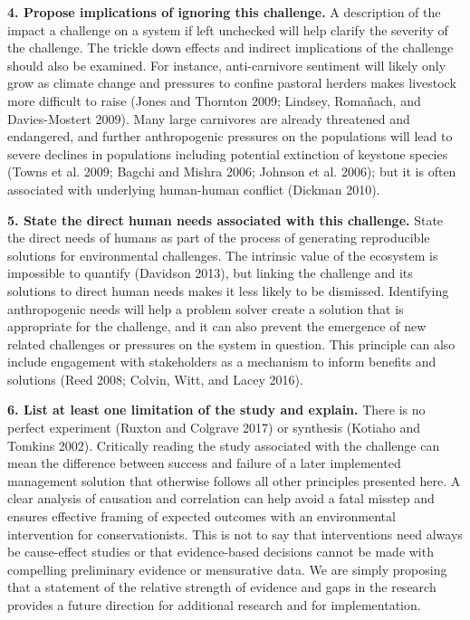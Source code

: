\documentclass[fleqn,10pt]{wlpeerj} %
\begin{document}
\textbf{4. Propose implications of ignoring this challenge.} A
description of the impact a challenge on a system if left unchecked will
help clarify the severity of the challenge. The trickle down effects and
indirect implications of the challenge should also be examined. For
instance, anti-carnivore sentiment will likely only grow as climate
change and pressures to confine pastoral herders makes livestock more
difficult to raise (Jones and Thornton 2009; Lindsey, Romañach, and
Davies-Mostert 2009). Many large carnivores are already threatened and
endangered, and further anthropogenic pressures on the populations will
lead to severe declines in populations including potential extinction of
keystone species (Towns et al. 2009; Bagchi and Mishra 2006; Johnson et
al. 2006); but it is often associated with underlying human-human
conflict (Dickman 2010).

\textbf{5. State the direct human needs associated with this challenge.}
State the direct needs of humans as part of the process of generating
reproducible solutions for environmental challenges. The intrinsic value
of the ecosystem is impossible to quantify (Davidson 2013), but linking
the challenge and its solutions to direct human needs makes it less
likely to be dismissed. Identifying anthropogenic needs will help a
problem solver create a solution that is appropriate for the challenge,
and it can also prevent the emergence of new related challenges or
pressures on the system in question. This principle can also include
engagement with stakeholders as a mechanism to inform benefits and
solutions (Reed 2008; Colvin, Witt, and Lacey 2016).

\textbf{6. List at least one limitation of the study and explain.} There
is no perfect experiment (Ruxton and Colgrave 2017) or synthesis
(Kotiaho and Tomkins 2002). Critically reading the study associated with
the challenge can mean the difference between success and failure of a
later implemented management solution that otherwise follows all other
principles presented here. A clear analysis of causation and correlation
can help avoid a fatal misstep and ensures effective framing of expected
outcomes with an environmental intervention for conservationists. This
is not to say that interventions need always be cause-effect studies or
that evidence-based decisions cannot be made with compelling preliminary
evidence or mensurative data. We are simply proposing that a statement
of the relative strength of evidence and gaps in the research provides a
future direction for additional research and for implementation.
\end{document}
